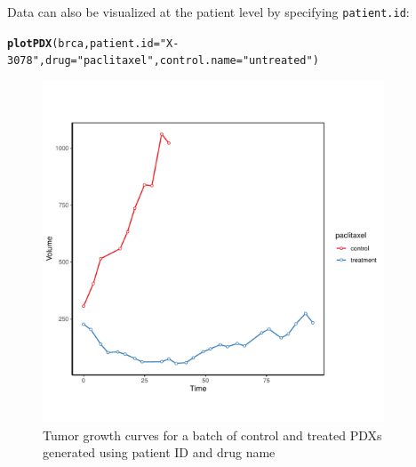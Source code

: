 \documentclass{article}\usepackage[]{graphicx}\usepackage[]{xcolor}
\makeatletter
\newcommand{\hlstr}[1]{\textcolor[rgb]{0.192,0.494,0.8}{#1}}%
\newcommand{\hlstd}[1]{\textcolor[rgb]{0.345,0.345,0.345}{#1}}%
\newcommand{\hlkwc}[1]{\textcolor[rgb]{0.333,0.667,0.333}{#1}}%
\newcommand{\hlkwd}[1]{\textcolor[rgb]{0.737,0.353,0.396}{\textbf{#1}}}%
\newenvironment{kframe}{%
 \def\at@end@of@kframe{}%
 \ifinner\ifhmode%
  \def\at@end@of@kframe{\end{minipage}}%
  \begin{minipage}{\columnwidth}%
 \fi\fi%
 \def\FrameCommand##1{\hskip\@totalleftmargin \hskip-\fboxsep
 \colorbox{shadecolor}{##1}\hskip-\fboxsep
     \hskip-\linewidth \hskip-\@totalleftmargin \hskip\columnwidth}%
 \MakeFramed {\advance\hsize-\width
   \@totalleftmargin\z@ \linewidth\hsize
   \@setminipage}}%
 {\par\unskip\endMakeFramed%
 \at@end@of@kframe}
\newenvironment{knitrout}{}{} %
\makeatother
\begin{document}
Data can also be visualized at the patient level by specifying \texttt{patient.id}:
\begin{knitrout}
\color{fgcolor}\begin{kframe}
\begin{alltt}
\hlkwd{plotPDX}\hlstd{(brca,} \hlkwc{patient.id}\hlstd{=}\hlstr{"X-3078"}\hlstd{,} \hlkwc{drug}\hlstd{=}\hlstr{"paclitaxel"}\hlstd{,}\hlkwc{control.name} \hlstd{=} \hlstr{"untreated"}\hlstd{)}
\end{alltt}
\end{kframe}\begin{figure}
\includegraphics[width=4in]{figure/pdxplot3-1} \caption[Tumor growth curves for a batch of control and treated PDXs generated using patient ID and drug name]{Tumor growth curves for a batch of control and treated PDXs generated using patient ID and drug name}\label{fig:pdxplot3}
\end{figure}

\end{knitrout}
\end{document}
